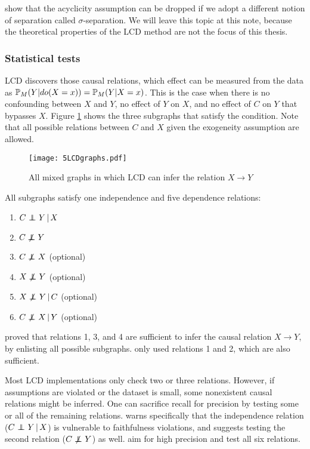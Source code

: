 \citet{mooij2016joint} show that the acyclicity assumption can be dropped if we adopt a different notion of separation called $\sigma$-separation. We will leave this topic at this note, because the theoretical properties of the LCD method are not the focus of this thesis.

\subsubsection{Statistical tests}

LCD discovers those causal relations, which effect can be measured from the data as $\mathbb{P} _M(Y|do(X=x)) = \mathbb{P} _M(Y|X=x)$. This is the case when there is no confounding between $X$ and $Y$, no effect of $Y$ on $X$, and no effect of $C$ on $Y$ that bypasses $X$. Figure \ref{fig:5:lcdgraphs} shows the three subgraphs that satisfy the condition. Note that all possible relations between $C$ and $X$ given the exogeneity assumption are allowed.

\begin{figure}[h]
    \centering
    \texttt{[image: 5LCDgraphs.pdf]}
    \caption{All mixed graphs in which LCD can infer the relation $X\to Y$}
    \label{fig:5:lcdgraphs}
\end{figure}

All subgraphs satisfy one independence and five dependence relations:

\begin{enumerate}[noitemsep]
    \item $C \operatorname*{{\,\perp\mkern-12mu\perp\,}} Y \,|\, X $
    \item $C \operatorname*{{\,\not\mkern-1mu\perp\mkern-12mu\perp\,}} Y$
    \item $C \operatorname*{{\,\not\mkern-1mu\perp\mkern-12mu\perp\,}} X$ (optional)
    \item $X \operatorname*{{\,\not\mkern-1mu\perp\mkern-12mu\perp\,}} Y$ (optional)
    \item $X \operatorname*{{\,\not\mkern-1mu\perp\mkern-12mu\perp\,}} Y \,|\, C$ (optional)
    \item $C \operatorname*{{\,\not\mkern-1mu\perp\mkern-12mu\perp\,}} X \,|\, Y$ (optional)
\end{enumerate}

\citet{cooper1997simple} proved that relations 1, 3, and 4 are sufficient to infer the causal relation $X\to Y$, by enlisting all possible subgraphs. \citet{versteeg2019boosting} only used relations 1 and 2, which are also sufficient.

Most LCD implementations only check two or three relations. However, if assumptions are violated or the dataset is small, some nonexistent causal relations might be inferred. One can sacrifice recall for precision by testing some or all of the remaining relations. \citet{cooper1997simple} warns specifically that the independence relation ($C \operatorname*{{\,\perp\mkern-12mu\perp\,}} Y \,|\, X$) is vulnerable to faithfulness violations, and suggests testing the second relation ($C \operatorname*{{\,\not\mkern-1mu\perp\mkern-12mu\perp\,}} Y$) as well. \citet{triantafillou2017predicting} aim for high precision and test all six relations.

